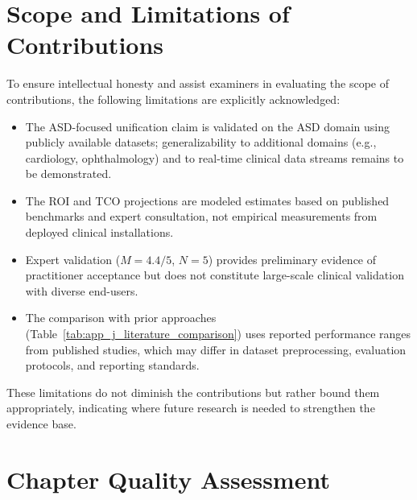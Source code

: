 \section{Scope and Limitations of Contributions}
\label{app_j:contribution_limits}

To ensure intellectual honesty and assist examiners in evaluating the scope of contributions, the following limitations are explicitly acknowledged:

\begin{itemize}
    \item The ASD-focused unification claim is validated on the ASD domain using publicly available datasets; generalizability to additional domains (e.g., cardiology, ophthalmology) and to real-time clinical data streams remains to be demonstrated.
    \item The ROI and TCO projections are modeled estimates based on published benchmarks and expert consultation, not empirical measurements from deployed clinical installations.
    \item Expert validation ($M = 4.4/5$, $N = 5$) provides preliminary evidence of practitioner acceptance but does not constitute large-scale clinical validation with diverse end-users.
    \item The comparison with prior approaches (Table~\ref{tab:app_j_literature_comparison}) uses reported performance ranges from published studies, which may differ in dataset preprocessing, evaluation protocols, and reporting standards.
\end{itemize}

These limitations do not diminish the contributions but rather bound them appropriately, indicating where future research is needed to strengthen the evidence base.

\section{Chapter Quality Assessment}
\label{app_j:ch8_quality}

